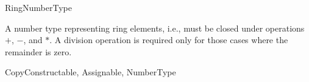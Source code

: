 \begin{ccRefConcept}{RingNumberType}

A number type representing ring elements, i.e., must be closed under
operations $+$, $-$, and $*$. A division operation is required only
for those cases where the remainder is zero.

\ccRefines
CopyConstructable, Assignable, NumberType

\ccSeeAlso
{} \\
\\

\end{ccRefConcept}
